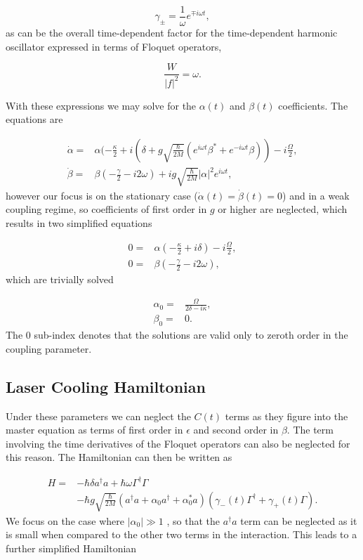 \documentclass[reprint, amsmath,amssymb, aps,pra]{revtex4-1}
\begin{document}
\begin{equation}
\gamma_\pm= \frac{1}{\omega}e^{\mp i\omega t},
\end{equation} as can be the overall time-dependent factor for the time-dependent harmonic oscillator expressed in terms of Floquet operators,

\begin{equation}
\frac{W}{|f|^2} = \omega.
\end{equation} 

With these expressions we may solve for the $\alpha(t)$ and $\beta(t)$ coefficients. The equations are

\begin{align}
\dot{\alpha} =& \alpha(-\frac{\kappa}{2}+i(\delta+g\sqrt{\frac{\hbar}{2M}}(e^{i\omega t} \beta^* + e^{-i\omega t} \beta))-i\frac{\Omega}{2},\\
\dot{\beta} =& \beta(-\frac{\gamma}{2}-i 2\omega)+ig\sqrt{\frac{\hbar}{2M}}|\alpha|^2e^{i\omega t},
\end{align}
however our focus is on the stationary case
($\dot{\alpha}(t)=\dot{\beta}(t)=0$) and in a weak coupling regime, so
coefficients of first order in $g$ or higher are neglected, which
results in two simplified equations

\begin{align}
0 =& \alpha(-\frac{\kappa}{2}+i\delta)-i\frac{\Omega}{2},\\
0 =& \beta(-\frac{\gamma}{2}-i 2\omega),
\end{align} which are trivially solved 

\begin{align}
\alpha_0 =& \frac{\Omega}{2\delta-i\kappa},\\
\beta_0 =& 0.
\end{align} The 0 sub-index denotes that the solutions are valid only to zeroth order in the coupling parameter. 

\subsection{Laser Cooling Hamiltonian}

Under these parameters we can neglect the $C(t)$ terms as they
figure into the
master equation as terms of first order in $\epsilon$ and second order
in $\beta$. The term involving the time derivatives of the Floquet
operators can also be neglected for this reason. The Hamiltonian can
then be written as

\begin{align}
H =& -\hbar \delta a^{\dagger}a +\hbar\omega\Gamma^{\dagger}\Gamma \\
&-\hbar g\sqrt{\frac{\hbar}{2M}}(a^{\dagger}a +\alpha_0 a^{\dagger}+\alpha^*_0 a)(\gamma_-(t)\Gamma^{\dagger}+\gamma_+(t)\Gamma)\nonumber.
\end{align} We focus on the case where $|\alpha_0| \gg 1$
\cite{BarberisLC}, so that the $a^\dagger a$ term can be neglected as
it is small when compared to the other two terms in the interaction.
This leads to a further simplified Hamiltonian
\end{document}
